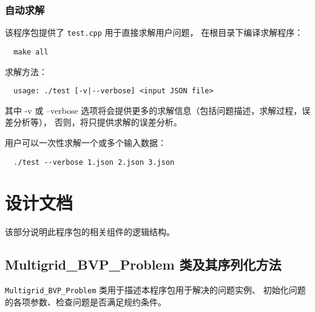 \documentclass[lang=cn,a4paper,newtx,bibend=bibtex]{elegantpaper}
\begin{document}
\subsubsection{自动求解}

该程序包提供了 \texttt{test.cpp} 用于直接求解用户问题，
在根目录下编译求解程序：

\begin{lstlisting}
  make all
\end{lstlisting}

求解方法：
\begin{lstlisting}
  usage: ./test [-v|--verbose] <input JSON file>
\end{lstlisting}

其中 -v 或 --verbose 选项将会提供更多的求解信息（包括问题描述，求解过程，误差分析等），
否则，将只提供求解的误差分析。

用户可以一次性求解一个或多个输入数据：
\begin{lstlisting}
  ./test --verbose 1.json 2.json 3.json
\end{lstlisting}

\section{设计文档}

该部分说明此程序包的相关组件的逻辑结构。

\subsection{Multigrid\_BVP\_Problem 类及其序列化方法}\label{2.1}

\texttt{Multigrid\_BVP\_Problem} 类用于描述本程序包用于解决的问题实例、
初始化问题的各项参数、检查问题是否满足规约条件。
\end{document}
